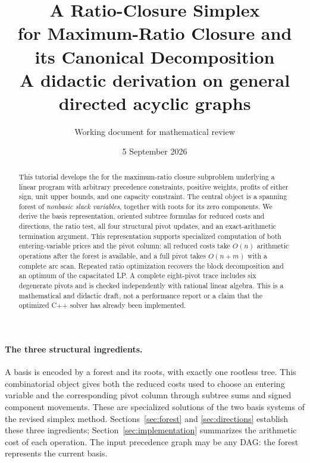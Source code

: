 \documentclass[11pt,a4paper]{article}
\title{A Ratio-Closure Simplex\\ for Maximum-Ratio Closure and its Canonical Decomposition\\[5pt]
\large A didactic derivation on general directed acyclic graphs}
\author{Working document for mathematical review}
\date{5 September 2026}
\numberwithin{equation}{section}
\theoremstyle{definition}
\theoremstyle{remark}
\begin{document}
\maketitle
\begin{abstract}
This tutorial develops the \FS{} for the maximum-ratio closure
subproblem underlying a linear program with arbitrary precedence constraints,
positive weights, profits of either sign, unit upper bounds, and one capacity
constraint. The central object is a spanning forest of \emph{nonbasic slack
variables}, together with roots for its zero components. We derive the basis
representation, oriented subtree formulas for reduced costs and directions,
the ratio test, all four structural pivot updates, and an exact-arithmetic
termination argument. This representation supports specialized computation
of both entering-variable prices and the pivot column: all reduced costs
take $O(n)$ arithmetic operations after the forest is available, and a full
pivot takes $O(n+m)$ with a complete arc scan. Repeated ratio optimization recovers the block
decomposition and an optimum of the capacitated LP. A complete eight-pivot
trace includes six degenerate pivots and is checked independently with rational
linear algebra. This is a mathematical and didactic draft, not a performance
report or a claim that the optimized C++ solver has already been implemented.
\end{abstract}

\paragraph{The three structural ingredients.}
A basis is encoded by a forest and its roots, with exactly one rootless
tree. This combinatorial object gives both the reduced costs used to choose
an entering variable and the corresponding pivot column through subtree
sums and signed component movements. These are specialized solutions of
the two basis systems of the revised simplex method. Sections~\ref{sec:forest} and
\ref{sec:directions} establish these three ingredients; Section~\ref{sec:implementation}
summarizes the arithmetic cost of each operation. The input precedence graph
may be any DAG: the forest represents the current basis.
\end{document}
